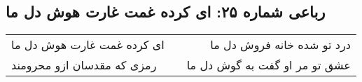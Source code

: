 \begin{center}
\section*{رباعی شماره ۲۵: ای کرده غمت غارت هوش دل ما}
\label{sec:sh025}
\begin{longtable}{l p{0.5cm} r}
ای کرده غمت غارت هوش دل ما
&&
درد تو شده خانه فروش دل ما
\\
رمزی که مقدسان ازو محرومند
&&
عشق تو مر او گفت به گوش دل ما
\\
\end{longtable}
\end{center}
